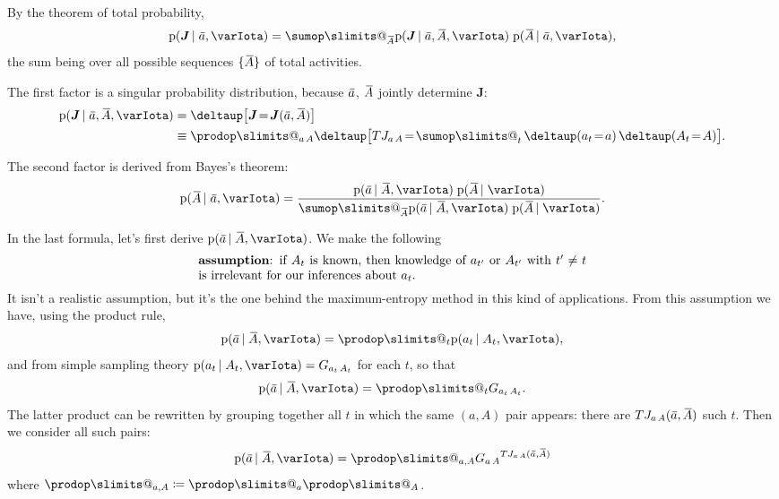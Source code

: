 \documentclass[\ifafour a4paper,12pt,\else a5paper,10pt,\fi%
onecolumn,oneside,article,%
british%
]{memoir}
\makeatletter
\theoremstyle{remark}
\theoremstyle{innote}
\def\sum{\DOTSI\sumop\slimits@}
\def\prod{\DOTSI\prodop\slimits@}
\newcommand*{\delt}{\deltaup}%
\newcommand*{\defd}{\coloneqq}
\DeclarePairedDelimiter\set{\{}{\}}
\newcommand*{\pf}{\mathrm{p}}%
\renewcommand*{\|}[1][]{\nonscript\,#1\vert\nonscript\;\mathopen{}}
\newcommand*{\tsum}{\mathop{\textstyle\sum}\nolimits}
\newcommand*{\widebar}[1]{{\mkern1.5mu\skew{2}\overline{\mkern-1.5mu#1\mkern-1.5mu}\mkern 1.5mu}}
\newcommand*{\yAs}{\widebar{A}}%
\newcommand*{\yas}{\widebar{a}}%
\newcommand*{\yI}{\varIota}
\newcommand*{\yJJ}{J}
\newcommand*{\yJ}{\bm{\yJJ}}
\newcommand*{\yeq}{\mathrel{\!=\!}}
\makeatother
\begin{document}
By the theorem of total probability,
\begin{equation}
  \label{eq:total_prob_As}
  \pf(\yJ \| \yas, \yI) =
  \sum_{\yAs}  \pf(\yJ \| \yas, \yAs, \yI)\; \pf(\yAs \| \yas, \yI),
\end{equation}
the sum being over all possible sequences $\set{\yAs}$ of total activities.

The first factor is a singular probability distribution, because $\yas$,
$\yAs$ jointly determine $\yJ$:
\begin{equation}
  \label{eq:singular_J}
  \begin{split}
  \pf(\yJ \| \yas, \yAs, \yI) 
&= \delt\bigl[\yJ \yeq \yJ(\yas,\yAs)\bigr]\\
&\equiv \prod_{a\,A}  \delt\bigl[T J_{a\,A} \yeq  \tsum_{t}
  \delt(a_{t} \yeq  a)\, \delt(A_{t} \yeq  A)\bigr].
\end{split}
\end{equation}

The second factor is derived from Bayes's theorem:
\begin{equation}
  \label{eq:bayes_sequences}
  \pf(\yAs \| \yas, \yI) =
  \frac{\pf(\yas \| \yAs, \yI)\;\pf(\yAs \| \yI)}
  {\sum_{\yAs}\pf(\yas \| \yAs, \yI)\;\pf(\yAs \| \yI)}.
\end{equation}

\bigskip

In the last formula, let's first derive $\pf(\yas \| \yAs, \yI)$. We make
the following
\begin{equation}
  \label{eq:assumption_irrelevance_t}
  \parbox{0.9\linewidth}{\textbf{assumption}: if $A_{t}$ is known, then
    knowledge of $a_{t'}$ or $A_{t'}$ with $t'\ne t$ is irrelevant for our
    inferences about $a_{t}$.}  
\end{equation}
It isn't a realistic assumption, but it's the one behind the
maximum-entropy method in this kind of applications. From this assumption
we have, using the product rule,
\begin{equation}
  \label{eq:factor_at_At}
  \pf(\yas \| \yAs, \yI) = \prod_{t} \pf(a_{t} \| A_{t}, \yI),
\end{equation}
and from simple sampling theory
$\pf(a_{t} \| A_{t}, \yI) = G_{a_{t}\,A_{t}}$ for each $t$, so that
\begin{equation}
  \label{eq:factor_at_At}
  \pf(\yas \| \yAs, \yI) = \prod_{t} G_{a_{t}\,A_{t}}.
\end{equation}
The latter product can be rewritten by grouping together all $t$ in which
the same $(a,A)$ pair appears: there are $T J_{a\,A}(\yas,\yAs)$ such $t$.
Then we consider all such pairs:
\begin{equation}
  \label{eq:factor_at_At_grouped}
  \pf(\yas \| \yAs, \yI) = \prod_{a,A} {G_{a\,A}}^{T J_{a\,A}(\yas,\yAs)}
\end{equation}
where $\prod_{a,A} \defd \prod_{a}\prod_{A}$.
\end{document}
